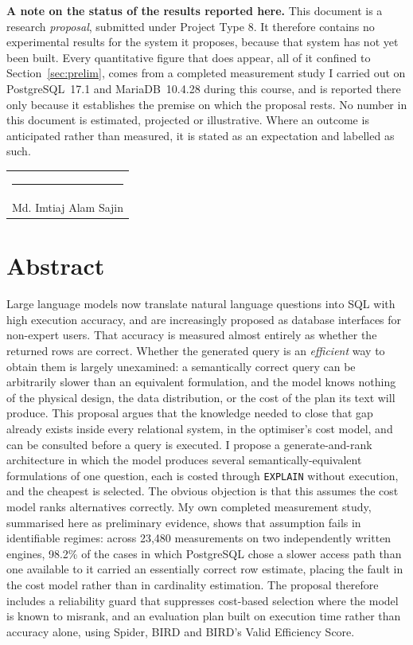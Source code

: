 \documentclass[12pt, a4paper]{article}
\begin{document}
\vspace{0.6em}
\noindent
\textbf{A note on the status of the results reported here.} This document
is a research \emph{proposal}, submitted under Project Type 8. It
therefore contains no experimental results for the system it proposes,
because that system has not yet been built. Every quantitative figure
that does appear, all of it confined to Section~\ref{sec:prelim}, comes
from a completed measurement study I carried out on PostgreSQL~17.1 and
MariaDB~10.4.28 during this course, and is reported there only because
it establishes the premise on which the proposal rests. No number in
this document is estimated, projected or illustrative. Where an outcome
is anticipated rather than measured, it is stated as an expectation and
labelled as such.

\vspace{1.2cm}
\noindent
\begin{tabular}{@{}p{6cm}@{}}
    \rule{5cm}{0.4pt} \\
    Md. Imtiaj Alam Sajin \\
\end{tabular}

\newpage

\section*{Abstract}
Large language models now translate natural language questions into SQL
with high execution accuracy, and are increasingly proposed as database
interfaces for non-expert users. That accuracy is measured almost
entirely as whether the returned rows are correct. Whether the generated
query is an \emph{efficient} way to obtain them is largely unexamined: a
semantically correct query can be arbitrarily slower than an equivalent
formulation, and the model knows nothing of the physical design, the
data distribution, or the cost of the plan its text will produce. This
proposal argues that the knowledge needed to close that gap already
exists inside every relational system, in the optimiser's cost model,
and can be consulted before a query is executed. I propose a
generate-and-rank architecture in which the model produces several
semantically-equivalent formulations of one question, each is costed
through \texttt{EXPLAIN} without execution, and the cheapest is
selected. The obvious objection is that this assumes the cost model
ranks alternatives correctly. My own completed measurement study,
summarised here as preliminary evidence, shows that assumption fails in
identifiable regimes: across 23{,}480 measurements on two independently
written engines, 98.2\% of the cases in which PostgreSQL chose a slower
access path than one available to it carried an essentially correct row
estimate, placing the fault in the cost model rather than in cardinality
estimation. The proposal therefore includes a reliability guard that
suppresses cost-based selection where the model is known to misrank, and
an evaluation plan built on execution time rather than accuracy alone,
using Spider, BIRD and BIRD's Valid Efficiency Score.
\end{document}
